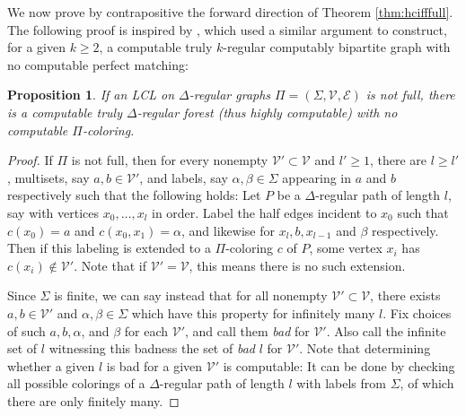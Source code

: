 \documentclass[11pt]{amsart}
\newtheorem{prop}[theorem]{Proposition}
\theoremstyle{definition}
\begin{document}
We now prove by contrapositive the forward direction of Theorem \ref{thm:hcifffull}. The following proof is inspired by \cite{MR_matching}, which used a similar argument to construct, for a given $k \geq 2$, a computable truly $k$-regular computably bipartite graph with no computable perfect matching:

\begin{prop}\label{prop:hcconstruction}
        If an LCL on $\Delta$-regular graphs $\Pi = (\Sigma,\mathcal{V},\mathcal{E})$ is not full, there is a computable truly $\Delta$-regular forest (thus highly computable) with no computable $\Pi$-coloring.
\end{prop}

\begin{proof}

If $\Pi$ is not full, then for every nonempty $\mathcal{V}' \subset \mathcal{V}$ and $l' \geq 1$, there are $l \geq l'$, multisets, say $a,b \in \mathcal{V}'$, and labels, say $\alpha, \beta \in \Sigma$ appearing in $a$ and $b$ respectively such that the following holds: Let $P$ be a $\Delta$-regular path of length $l$, say with vertices $x_0,\ldots,x_l$ in order. Label the half edges incident to $x_0$ such that $c(x_0) = a$ and $c(x_0,x_1) = \alpha$, and likewise for $x_l, b, x_{l-1}$ and $\beta$ respectively. Then if this labeling is extended to a $\Pi$-coloring $c$ of $P$, some vertex $x_i$ has $c(x_i) \not\in \mathcal{V}'$. Note that if $\mathcal{V}' = \mathcal{V}$, this means there is no such extension. 

Since $\Sigma$ is finite, we can say instead that for all nonempty $\mathcal{V}' \subset \mathcal{V}$, there exists $a,b \in \mathcal{V}'$ and $\alpha,\beta \in \Sigma$ which have this property for infinitely many $l$. Fix choices of such $a,b,\alpha$, and $\beta$ for each $\mathcal{V}'$, and call them \textit{bad} for $\mathcal{V}'$. Also call the infinite set of $l$ witnessing this badness the set of \textit{bad} $l$ for $\mathcal{V}'$. Note that determining whether a given $l$ is bad for a given $\mathcal{V}'$ is computable: It can be done by checking all possible colorings of a $\Delta$-regular path of length $l$ with labels from $\Sigma$, of which there are only finitely many.



\end{proof}
\end{document}
